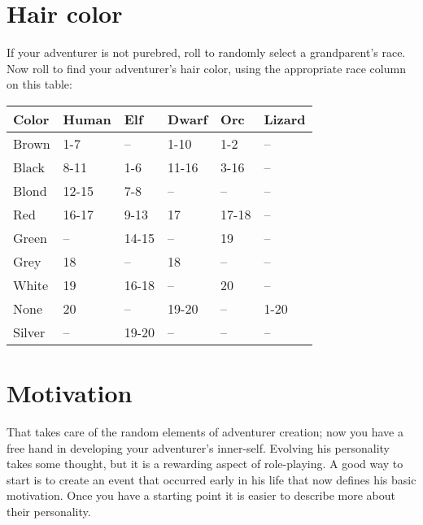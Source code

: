 \begin{multicols*}{2}
\section{Hair color}

If your adventurer is not purebred, roll  to randomly select a grandparent's race. Now roll  to find your adventurer's hair color, using the appropriate race column on this table:
\begin{normbox}
\begin{tabular}{l l l l l l}
\small
\textbf{Color} & \textbf{Human} & \textbf{Elf} & \textbf{Dwarf} & \textbf{Orc} & \textbf{Lizard}\\
\midrule
\small
Brown & 1-7 & -- & 1-10 & 1-2 & --\\
Black & 8-11 & 1-6 & 11-16 & 3-16 & --\\
Blond & 12-15 & 7-8 & -- & -- & --\\
Red & 16-17 & 9-13 & 17 & 17-18 & --\\
Green & -- & 14-15 & -- & 19 & --\\
Grey & 18 & -- & 18 & -- & --\\
White & 19 & 16-18 & -- & 20 & --\\
None & 20 & -- & 19-20 & -- & 1-20\\
Silver & -- & 19-20 & -- & -- & --
\end{tabular}
\end{normbox}
\section{Motivation}
That takes care of the random elements of adventurer creation; now you have a free hand in developing your adventurer's inner-self. Evolving his personality takes some thought, but it is a rewarding aspect of role-playing. A good way to start is to create an event that occurred early in his life that now defines his basic motivation. Once you have a starting point it is easier to describe more about their personality.


\end{multicols*}
